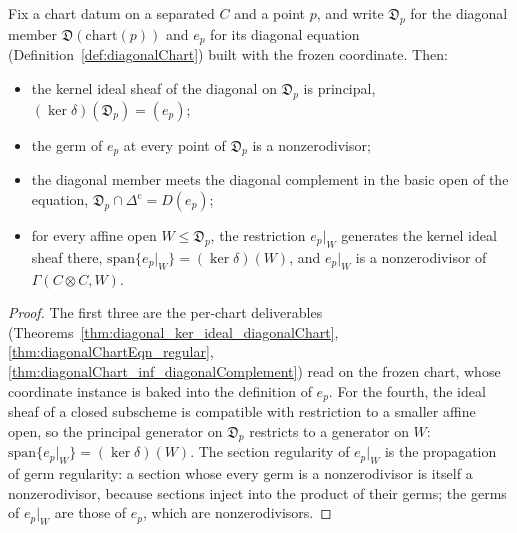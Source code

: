 \begin{theorem}
  \label{thm:diagonalChartData_equation}
  \leanok
  Fix a chart datum on a separated \(C\) and a point \(p\), and write \(\mathfrak D_p\) for the
  diagonal member \(\mathfrak D(\mathrm{chart}(p))\) and \(e_p\) for its diagonal equation
  (Definition~\ref{def:diagonalChart}) built with the frozen coordinate. Then:
  \begin{itemize}
    \item the kernel ideal sheaf of the diagonal on \(\mathfrak D_p\) is principal, \((\ker
      \delta)(\mathfrak D_p) = (e_p)\);
    \item the germ of \(e_p\) at every point of \(\mathfrak D_p\) is a nonzerodivisor;
    \item the diagonal member meets the diagonal complement in the basic open of the equation,
      \(\mathfrak D_p \cap \Delta^{\mathrm c} = D(e_p)\);
    \item for every affine open \(W \le \mathfrak D_p\), the restriction \(e_p|_W\) generates the
      kernel ideal sheaf there, \(\mathrm{span}\{e_p|_W\} = (\ker \delta)(W)\), and \(e_p|_W\) is a
      nonzerodivisor of \(\Gamma(C \otimes C, W)\).
  \end{itemize}
\end{theorem}
\begin{proof}
  \leanok
  The first three are the per-chart deliverables (Theorems~\ref{thm:diagonal_ker_ideal_diagonalChart},
  \ref{thm:diagonalChartEqn_regular}, \ref{thm:diagonalChart_inf_diagonalComplement}) read on the
  frozen chart, whose coordinate instance is baked into the definition of \(e_p\). For the fourth,
  the ideal sheaf of a closed subscheme is compatible with restriction to a smaller affine open, so
  the principal generator on \(\mathfrak D_p\) restricts to a generator on \(W\): \(\mathrm{span}\{e_p|_W\}
  = (\ker \delta)(W)\). The section regularity of \(e_p|_W\) is the propagation of germ regularity:
  a section whose every germ is a nonzerodivisor is itself a nonzerodivisor, because sections inject
  into the product of their germs; the germs of \(e_p|_W\) are those of \(e_p\), which are
  nonzerodivisors.
\end{proof}

